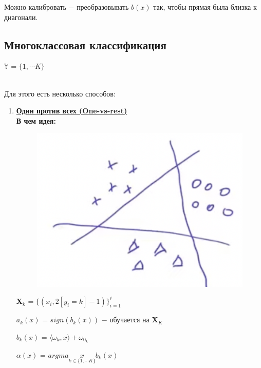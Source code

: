         Можно калибровать $-$ преобразовывать $b(x)$ так, чтобы прямая была близка к диагонали.
    

    \subsection{Многоклассовая классификация}
    \begin{center}
        $\mathbb{Y}$ = $\{1, \cdots K \}$
    \end{center}

    \\

    Для этого есть несколько способов:
    \begin{enumerate}
        \item \underline{\textbf{Один против всех (One-vs-rest)}}\\

            \textbf{В чем идея:}\\
            \begin{figure}[H]
                \centering
                \includegraphics[width=0.35  \textwidth]{images/7lecture/one_vs_rest.png}
            \end{figure}
            \begin{center}
                $\mathbf{X}_k$ = $\{(x_i, 2[y_i = k] - 1) \}_{i = 1}^\ell$
            \end{center}

            \begin{center}
                $a_k(x)$ = $sign(b_k(x))$ $-$ обучается на $\mathbf{X}_K$
            \end{center}

            \begin{center}
                $b_k(x)$ = $\langle \omega_k, x\rangle + \omega_{0_k}$
            \end{center}

            \begin{center}
            \large
                $\alpha(x)$ = $argmax\limits_{k \in \{1, \cdots K\}}b_k(x)$
            \end{center}


\end{enumerate}
